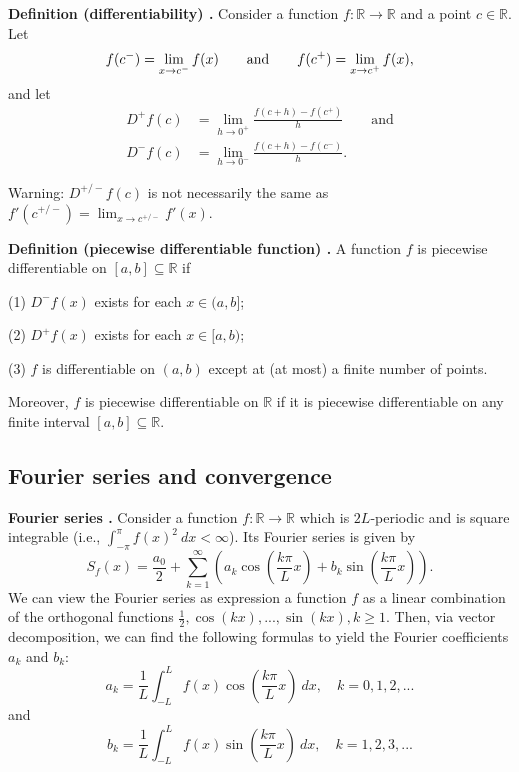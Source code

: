 \begin{shaded}
\textbf{Definition (differentiability) \cite{math2111_notes}.} Consider a function $ f : \mathbb{R} \to \mathbb{R} $ and a point $c \in \mathbb{R}$. Let
$$ f(c^-) = \lim_{x \to c^-} f(x) \qquad \textnormal{and} \qquad f(c^+) = \lim_{x \to c^+} f(x) , $$
and let
\begin{align*}
	D^+ f(c) &= \lim_{h \to 0^+} \frac{f(c + h) - f(c^+)}{h} \qquad \text{and} \\
	D^- f(c) &= \lim_{h \to 0^-} \frac{f(c + h) - f(c^-)}{h} .
\end{align*}

Warning: $D^{+/-} f(c)$ is not necessarily the same as $f'(c^{+/-}) = \lim_{x \to c^{+/-}} f'(x)$.
\end{shaded}

\begin{shaded}
\textbf{Definition (piecewise differentiable function) \cite{math2111_notes}.} A function $f$ is piecewise differentiable on $[a, b] \subseteq \mathbb{R}$ if

(1) $D^- f(x)$ exists for each $x \in (a, b]$;

(2) $D^+ f(x)$ exists for each $x \in [a, b)$;

(3) $f$ is differentiable on $(a, b)$ except at (at most) a finite number of points.

Moreover, $f$ is piecewise differentiable on $\mathbb{R}$ if it is piecewise differentiable on any finite interval $[a, b] \subseteq \mathbb{R}$.
\end{shaded}

\subsection{Fourier series and convergence}

\begin{shaded}
\textbf{Fourier series \cite{math2111_notes}.} Consider a function $f : \mathbb{R} \to \mathbb{R}$ which is $2 L$-periodic and is square integrable (i.e., $\int_{-\pi}^\pi f(x)^2 \ dx < \infty $). Its Fourier series is given by
$$ S_f(x) = \frac{a_0}{2} + \sum_{k = 1}^{\infty} \left( a_k \cos \left( \frac{k \pi}{L}x \right) + b_k \sin \left( \frac{k \pi}{L}x \right) \right) . $$
We can view the Fourier series as expression a function $f$ as a linear combination of the orthogonal functions $\frac{1}{2}, \cos(kx), ..., \sin(kx), k \geq 1$. Then, via vector decomposition, we can find the following formulas to yield the Fourier coefficients $a_k$ and $b_k$:
$$ a _k = \frac{1}{L} \int_{-L}^L f(x) \cos \left( \frac{k \pi}{L}x \right) \ dx, \quad k = 0, 1, 2, ... $$
and
$$ b _k = \frac{1}{L} \int_{-L}^L f(x) \sin \left( \frac{k \pi}{L}x \right) \ dx, \quad k = 1, 2, 3, ... $$
\end{shaded}

